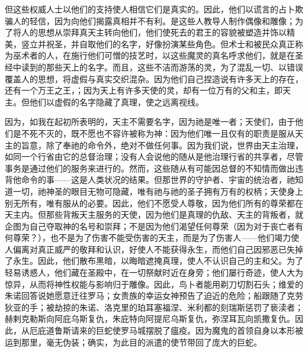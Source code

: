 但这些权威人士以他们的支持使人相信它们是真实的。因此，他们以谎言的占卜欺骗人的轻信，因为向他们揭露真相并不有利。是这些人教导人制作偶像和雕像；为了将人的思想从崇拜真天主转向他们，他们使死去的君王的容貌被塑造并饰以精美，竖立并祝圣，并自取他们的名字，好像扮演某些角色。但术士和被民众真正称为巫术者的人，在施行他们可憎的技艺时，以这些魔灵的真名呼求他们，就是在圣经中读到的那些天上的名字。而且，这些不洁而游荡的灵，为了混乱一切、以错误覆盖人的思想，将虚假与真实交织混杂。因为他们自己捏造说有许多天上的存在，还有一个万王之王，；因为天上有许多天使的灵，却有一位万有的父和主，即天主。但他们以虚假的名字隐藏了真理，使之远离视线。\par

因为，如我在起初所表明的，天主不需要名字，因为祂是唯一者；天使们，由于他们是不死不灭的，既不愿也不容许被称为神：因为他们唯一且仅有的职责是服从天主的旨意，除了奉祂的命令外，绝对不做任何事。因为我们说，世界由天主治理，如同一个行省由它的总督治理；没有人会说他的随从是他治理行省的共享者，尽管事务是通过他们的服务来进行的。然而，这些随从有可能因总督的不知情而做出违背他命令的事——这是人类状况的结果。但那世界的守护者、宇宙的统治者，祂知道一切，祂神圣的眼目无物可隐藏，唯有祂与祂的圣子拥有万有的权柄；天使身上别无所有，唯有服从的必要。因此，他们不愿受人尊敬，因为他们所有的尊荣都在天主内。但那些背叛天主服务的天使，因为他们是真理的仇敌、天主的背叛者，就企图为自己夺取神的名号和崇拜；不是因为他们渴望任何尊荣（因为对于丧亡者有何尊荣？），也不是为了伤害不能受伤害的天主，而是为了伤害人——他们竭力使人偏离对真正威严的敬拜和认识，好使人不能获得永生，而他们自己因邪恶已失掉了永生。因此，他们散布黑暗，以晦暗遮掩真理，使人不认识自己的主和父。为了轻易诱惑人，他们藏在圣殿中，在一切祭献时近在身旁；他们屡行奇迹，使人大为惊异，从而将神性权能与影响归于雕像。因此，鸟卜者能用剃刀切割石头；维爱的朱诺回答说她愿意迁往罗马；女贵族的幸运女神预告了迫近的危险；船跟随了克劳狄亚的手；被劫掠的朱诺、洛克里的珀耳塞福涅、米利都的刻瑞斯惩罚了亵渎者；赫剌克勒斯向阿庇乌斯复仇，朱庇特向阿提尼乌斯复仇，弥涅耳瓦向凯撒复仇。因此，从厄庇道鲁斯请来的巨蛇使罗马城摆脱了瘟疫。因为魔鬼的首领自身以本形被运到那里，毫无伪装；确实，为此目的派遣的使节带回了庞大的巨蛇。\par

